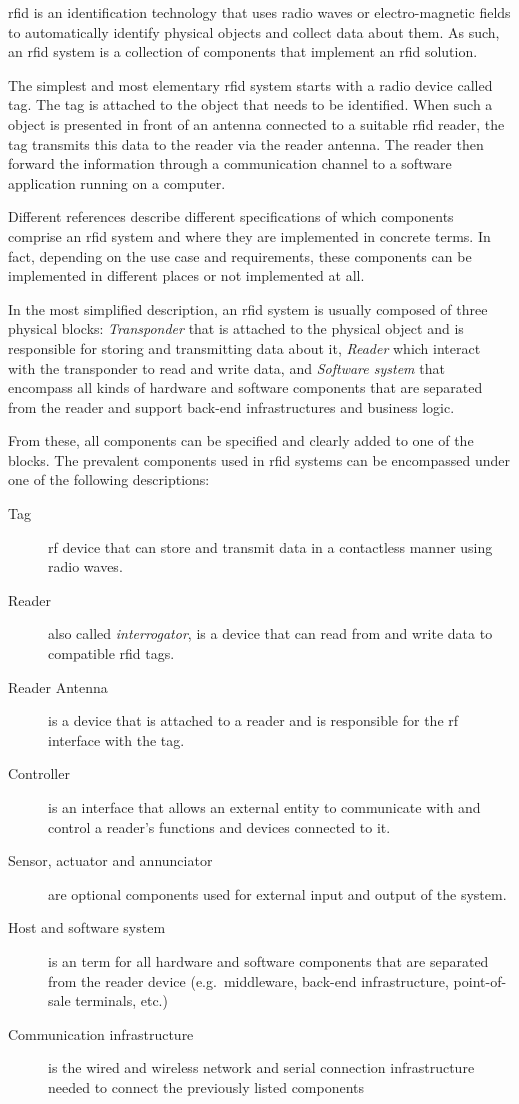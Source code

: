 \ac{rfid} is an identification technology that uses radio waves or electro-magnetic fields to automatically identify physical objects and collect data about them.
As such, an \ac{rfid} system is a collection of components that implement an \ac{rfid} solution.

The simplest and most elementary \ac{rfid} system starts with a radio device called tag. The tag is attached to the object that needs to be identified. When such a object is presented in front of an antenna connected to a suitable \ac{rfid} reader, the tag transmits this data to the reader via the reader antenna. The reader then forward the information through a communication channel to a software application running on a computer.

Different references describe different specifications of which components comprise an \ac{rfid} system and where they are implemented in concrete terms.
In fact, depending on the use case and requirements, these components can be implemented in different places or not implemented at all.

In the most simplified description, an \ac{rfid} system is usually composed of three physical blocks: \emph{Transponder} that is attached to the physical object and is responsible for storing and transmitting data about it, \emph{Reader} which interact with the transponder to read and write data, and \emph{Software system} that encompass all kinds of hardware and software components that are separated from the reader and support back-end infrastructures and business logic.

From these, all components can be specified and clearly added to one of the blocks.
The prevalent components used in \ac{rfid} systems can be encompassed under one of the following descriptions:

\begin{description}
    \item[Tag] \ac{rf} device that can store and transmit data in a contactless manner using radio waves.
    \item[Reader] also called \emph{interrogator}, is a device that can read from and write data to compatible \ac{rfid} tags.
    \item[Reader Antenna] is a device that is attached to a reader and is responsible for the \ac{rf} interface with the tag.
    \item[Controller] is an interface that allows an external entity to communicate with and control a reader's functions and devices connected to it.
    \item[Sensor, actuator and annunciator] are optional components used for external input and output of the system.
    \item[Host and software system] is an term for all hardware and software components that are separated from the reader device (e.g.\ middleware, back-end infrastructure, point-of-sale terminals, etc.)
    \item[Communication infrastructure] is the wired and wireless network and serial connection infrastructure needed to connect the previously listed components
\end{description}

